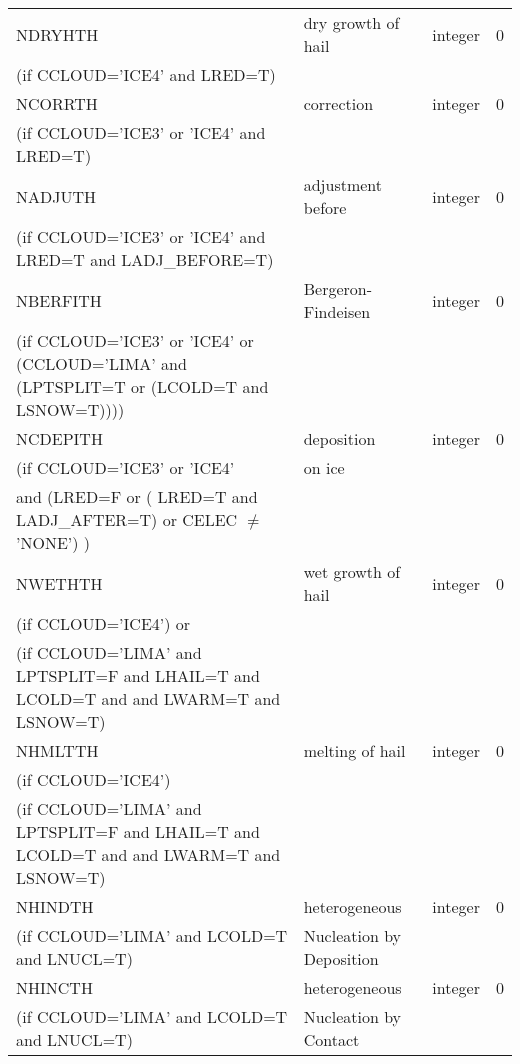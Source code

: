 \begin{longtable} {|p{}|p{}|>{\centering}p{}|p{}<{\centering}|}
NDRYHTH  & dry growth of hail          & integer  &  0 \index{NDRYHTH!\innam{NAM\_BU\_RTH}}\\ \nopagebreak
(if CCLOUD='ICE4' and LRED=T) & &   &  \\\hline
NCORRTH  & correction          & integer  &  0 \index{NCORRTH!\innam{NAM\_BU\_RTH}}\\ \nopagebreak
(if CCLOUD='ICE3' or 'ICE4' and LRED=T) & &   &  \\\hline
NADJUTH  & adjustment before          & integer  &  0 \index{NADJUTH!\innam{NAM\_BU\_RTH}}\\ \nopagebreak
(if CCLOUD='ICE3' or 'ICE4' and LRED=T and LADJ\_BEFORE=T) & &   &  \\\hline
NBERFITH  & Bergeron-Findeisen   & integer  &  0 \index{NBERFITH!\innam{NAM\_BU\_RTH}}\\ \nopagebreak
(if CCLOUD='ICE3' or 'ICE4' or (CCLOUD='LIMA' and (LPTSPLIT=T or (LCOLD=T and LSNOW=T)))) & &   &  \\\hline
NCDEPITH  & deposition  & integer  &  0 \index{NCDEPITH!\innam{NAM\_BU\_RTH}}\\ \nopagebreak
(if CCLOUD='ICE3' or 'ICE4' & on ice   & &  \\
and (LRED=F or ( LRED=T and LADJ\_AFTER=T) or CELEC $\neq$ 'NONE')  ) & & & \\\hline
NWETHTH   & wet growth of hail   & integer  &  0 \index{NWETHTH!\innam{NAM\_BU\_RTH}}\\ \nopagebreak
(if CCLOUD='ICE4') or &  &        &   \\ \nopagebreak
(if CCLOUD='LIMA' and LPTSPLIT=F and LHAIL=T and LCOLD=T and and LWARM=T and LSNOW=T)   &  &        &   \\\hline
NHMLTTH   & melting of hail      & integer  &  0 \index{NHMLTTH!\innam{NAM\_BU\_RTH}}\\ \nopagebreak
(if CCLOUD='ICE4')   &   &       &   \\ \nopagebreak
(if CCLOUD='LIMA' and LPTSPLIT=F and LHAIL=T and LCOLD=T and and LWARM=T and LSNOW=T)   &  &        &   \\\hline
NHINDTH   & heterogeneous & integer  &  0 \index{NHINDTH!\innam{NAM\_BU\_RTH}}\\ \nopagebreak
(if CCLOUD='LIMA' and LCOLD=T and LNUCL=T)   &Nucleation by Deposition   &       &   \\\hline
NHINCTH   & heterogeneous & integer  &  0 \index{NHINCTH!\innam{NAM\_BU\_RTH}}\\ \nopagebreak
(if CCLOUD='LIMA' and LCOLD=T and LNUCL=T)   & Nucleation by Contact  &       &   \\\hline

\end{longtable}
